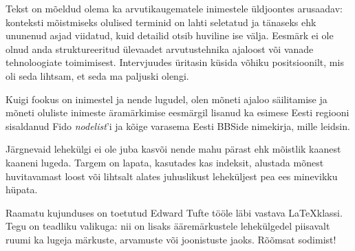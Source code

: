 Tekst on mõeldud olema ka arvutikaugematele inimestele üldjoontes arusaadav: 
konteksti mõistmiseks olulised terminid on lahti seletatud ja tänaseks ehk 
ununenud asjad viidatud, kuid detailid otsib huviline ise välja. Eesmärk ei ole 
olnud anda struktureeritud ülevaadet arvutustehnika ajaloost või vanade 
tehnoloogiate toimimisest. Intervjuudes üritasin küsida võhiku 
positsioonilt, mis oli seda lihtsam, et seda ma paljuski olengi.

Kuigi fookus on inimestel ja nende lugudel, olen mõneti ajaloo säilitamise ja 
mõneti oluliste inimeste äramärkimise eesmärgil lisanud ka esimese Eesti regiooni
sisaldanud Fido \emph{nodelist}'i ja kõige varasema Eesti BBSide nimekirja, mille 
leidsin.

Järgnevaid lehekülgi ei ole juba kasvõi nende mahu pärast ehk mõistlik kaanest 
kaaneni lugeda. Targem on lapata, kasutades kas indeksit, 
alustada mõnest huvitavamast loost või lihtsalt alates juhuslikust leheküljest 
pea ees minevikku hüpata.

Raamatu kujunduses on toetutud Edward Tufte tööle läbi vastava \LaTeX klassi.
Tegu on teadliku valikuga: nii on lisaks ääremärkustele lehekülgedel piisavalt ruumi 
ka lugeja märkuste, arvamuste või joonistuste jaoks. Rõõmsat sodimist!

